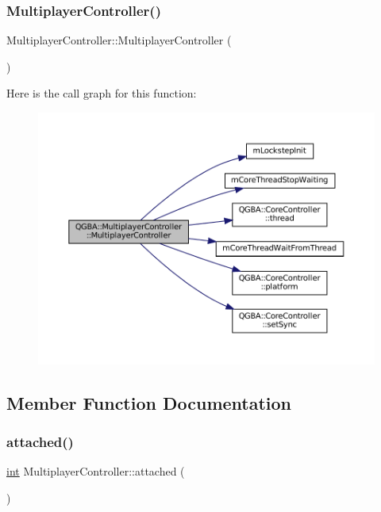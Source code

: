 \subsubsection{\texorpdfstring{Multiplayer\+Controller()}{MultiplayerController()}}
{\footnotesize\ttfamily Multiplayer\+Controller\+::\+Multiplayer\+Controller (\begin{DoxyParamCaption}{ }\end{DoxyParamCaption})}

Here is the call graph for this function\+:
\nopagebreak
\begin{figure}[H]
\begin{center}
\leavevmode
\includegraphics[width=350pt]{class_q_g_b_a_1_1_multiplayer_controller_a2b20b2d598b93284d460940d13addd58_cgraph}
\end{center}
\end{figure}


\subsection{Member Function Documentation}
\mbox{\label{class_q_g_b_a_1_1_multiplayer_controller_a198d9f12525ba6ff641510acaf780ed2}} 
\subsubsection{\texorpdfstring{attached()}{attached()}}
{\footnotesize\ttfamily \mbox{\hyperlink{ioapi_8h_a787fa3cf048117ba7123753c1e74fcd6}{int}} Multiplayer\+Controller\+::attached (\begin{DoxyParamCaption}{ }\end{DoxyParamCaption})}

